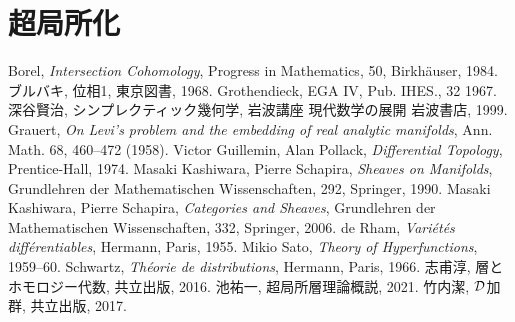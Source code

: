 \section{超局所化}







































\begin{thebibliography}{20} 
     Borel, 
        \textit{Intersection Cohomology}, 
        Progress in Mathematics, 50, Birkh\"auser, 1984.
     ブルバキ, 位相1, 東京図書, 1968.
     Grothendieck, EGA IV, Pub. IHES., 32 1967.
     深谷賢治, シンプレクティック幾何学, 岩波講座 現代数学の展開 岩波書店, 1999.
     Grauert, 
        \textit{On Levi's problem and the embedding of real analytic manifolds}, 
        Ann. Math. 68, 460--472 (1958).
     Victor Guillemin, Alan Pollack, 
        \textit{Differential Topology}, 
        Prentice-Hall, 1974.
     Masaki Kashiwara, Pierre Schapira, 
        \textit{Sheaves on Manifolds}, 
        Grundlehren der Mathematischen Wissenschaften, 292, Springer, 1990.
     Masaki Kashiwara, Pierre Schapira, 
        \textit{Categories and Sheaves}, 
        Grundlehren der Mathematischen Wissenschaften, 332, Springer, 2006.
     de Rham, 
        \textit{Vari\'et\'es diff\'erentiables}, 
        Hermann, Paris, 1955.
     Mikio Sato, 
        \textit{Theory of Hyperfunctions}, 
        1959--60.
     Schwartz, 
        \textit{Th\'eorie de distributions}, 
        Hermann, Paris, 1966.
     志甫淳, 層とホモロジー代数, 共立出版, 2016.
     池祐一, 超局所層理論概説, 2021.
     竹内潔, \(\mathcal{D}\)加群, 共立出版, 2017.
\end{thebibliography}




